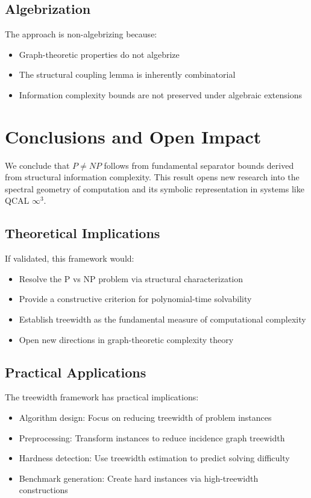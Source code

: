 \documentclass[11pt]{article}
\begin{document}
\subsection{Algebrization}

The approach is non-algebrizing because:
\begin{itemize}
\item Graph-theoretic properties do not algebrize
\item The structural coupling lemma is inherently combinatorial
\item Information complexity bounds are not preserved under algebraic extensions
\end{itemize}

\section{Conclusions and Open Impact}

We conclude that $P \neq NP$ follows from fundamental separator bounds derived from structural information complexity. This result opens new research into the spectral geometry of computation and its symbolic representation in systems like QCAL $\infty^3$.

\subsection{Theoretical Implications}

If validated, this framework would:
\begin{itemize}
\item Resolve the P vs NP problem via structural characterization
\item Provide a constructive criterion for polynomial-time solvability
\item Establish treewidth as the fundamental measure of computational complexity
\item Open new directions in graph-theoretic complexity theory
\end{itemize}

\subsection{Practical Applications}

The treewidth framework has practical implications:
\begin{itemize}
\item Algorithm design: Focus on reducing treewidth of problem instances
\item Preprocessing: Transform instances to reduce incidence graph treewidth
\item Hardness detection: Use treewidth estimation to predict solving difficulty
\item Benchmark generation: Create hard instances via high-treewidth constructions
\end{itemize}
\end{document}
